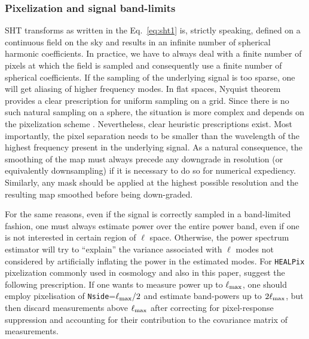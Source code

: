 \documentclass[usenatbib]{mnrasb}
\begin{document}
      \subsubsection{Pixelization and signal band-limits}

      SHT transforms as written in the Eq.~\ref{eq:sht1} is, strictly
      speaking, defined on a continuous field on the sky and results
      in an infinite number of spherical harmonic coefficients. In
      practice, we have to always deal with a finite number of pixels
      at which the field is sampled and consequently use a finite
      number of spherical coefficients. If the sampling of the
      underlying signal is too sparse, one will get aliasing of higher
      frequency modes. In flat spaces, Nyquist theorem provides a
      clear prescription for uniform sampling on a grid. Since there
      is no such natural sampling on a sphere, the situation is more
      complex and depends on the pixelization scheme
      \cite{Driscoll:1994:CFT:184069.184073,
        DBLP:journals/corr/abs-1110-6297}. Nevertheless, clear
      heuristic prescriptions exist. Most importantly, the pixel separation needs
      to be smaller than the wavelength of the highest frequency
      present in the underlying signal. As a natural consequence, the
      smoothing of the map must always precede any downgrade in
      resolution (or equivalently downsampling) if it is necessary to
      do so for numerical expediency.  Similarly, any mask should be
      applied at the highest possible resolution and the resulting
      map smoothed before being down-graded.

      For the same reasons, even if the signal is correctly sampled in
      a band-limited fashion, one must always estimate power over the
      entire power band, even if one is not interested in certain
      region of $\ell$ space. Otherwise, the power spectrum estimator
      will try to ``explain'' the variance associated with $\ell$
      modes not considered by artificially inflating the power in the
      estimated modes. For {\tt HEALPix} \citep{2005ApJ...622..759G}
      pixelization commonly used in cosmology and also in this paper,
      \cite{2013MNRAS.435.1857L} suggest the following
      prescription. If one wants to measure power up to $\ell_{\rm
        max}$, one should employ pixelisation of
      \texttt{Nside}=$\ell_{\rm max}/2$ and estimate band-powers up
      to $2 \ell_{\rm max}$, but then discard measurements above $\ell_{\rm
        max}$ after correcting for pixel-response suppression and
      accounting for their contribution to the covariance matrix of
      measurements. 
\end{document}

